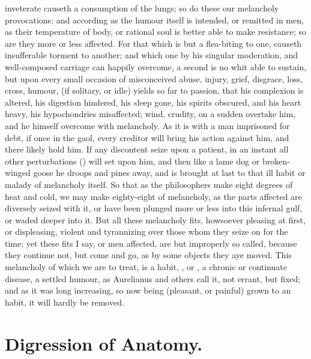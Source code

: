 {inveterate causeth a consumption of the lungs; so do these our
melancholy provocations: and according as the humour itself is
intended, or remitted in men, as their temperature of body, or rational
soul is better able to make resistance; so are they more or less
affected. For that which is but a flea-biting to one, causeth
insufferable torment to another; and which one by his singular
moderation, and well-composed carriage can happily overcome, a second
is no whit able to sustain, but upon every small occasion of
misconceived abuse, injury, grief, disgrace, loss, cross, humour, \etc{}
(if solitary, or idle) yields so far to passion, that his complexion is
altered, his digestion hindered, his sleep gone, his spirits obscured,
and his heart heavy, his hypochondries misaffected; wind, crudity, on a
sudden overtake him, and he himself overcome with melancholy. As it is
with a man imprisoned for debt, if once in the gaol, every creditor
will bring his action against him, and there likely hold him. If any
discontent seize upon a patient, in an instant all other perturbations
() will set upon him, and then like a lame dog
or broken-winged goose he droops and pines away, and is brought at last
to that ill habit or malady of melancholy itself. So that as the
philosophers make eight degrees of heat and cold, we may make
eighty-eight of melancholy, as the parts affected are diversely seized
with it, or have been plunged more or less into this infernal gulf, or
waded deeper into it. But all these melancholy fits, howsoever pleasing
at first, or displeasing, violent and tyrannizing over those whom they
seize on for the time; yet these fits I say, or men affected, are but
improperly so called, because they continue not, but come and go, as by
some objects they aye moved. This melancholy of which we are to treat,
is a habit, , or , a chronic or continuate
disease, a settled humour, as Aurelianus and others call it,
not errant, but fixed; and as it was long increasing, so now being
(pleasant, or painful) grown to an habit, it will hardly be removed.


\section{Digression of Anatomy.}

}
